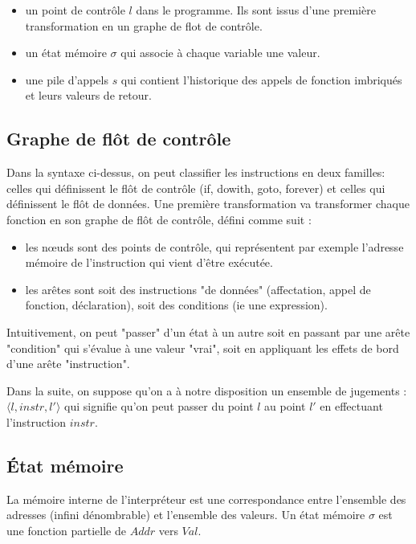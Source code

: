 \documentclass{article}
\begin{document}
\begin{itemize}
\item
  un point de contrôle $l$ dans le programme. Ils sont issus d'une
  première transformation en un graphe de flot de contrôle.
\item
  un état mémoire $σ$ qui associe à chaque variable une valeur.
\item
  une pile d'appels $s$ qui contient l'historique des appels de fonction
  imbriqués et leurs valeurs de retour.
\end{itemize}

\subsection{Graphe de flôt de contrôle}

Dans la syntaxe ci-dessus, on peut classifier les instructions en deux familles:
celles qui définissent le flôt de contrôle (if, dowith, goto, forever) et celles
qui définissent le flôt de données. Une première transformation va transformer
chaque fonction en son graphe de flôt de contrôle, défini comme suit :

\begin{itemize}
\item
  les nœuds sont des points de contrôle, qui représentent par exemple
  l'adresse mémoire de l'instruction qui vient d'être exécutée.
\item
  les arêtes sont soit des instructions "de données" (affectation,
  appel de fonction, déclaration), soit des conditions (ie une
  expression).
\end{itemize}

Intuitivement, on peut "passer" d'un état à un autre soit en passant par une
arête "condition" qui s'évalue à une valeur "vrai", soit en appliquant les
effets de bord d'une arête "instruction".

Dans la suite, on suppose qu'on a à notre disposition un ensemble de jugements :
$\langle l, instr, l' \rangle$ qui signifie qu'on peut passer du point $l$ au
point $l'$ en effectuant l'instruction $instr$.

\subsection{État mémoire}

La mémoire interne de l'interpréteur est une correspondance entre l'ensemble des
adresses (infini dénombrable) et l'ensemble des valeurs. Un état mémoire $σ$ est
une fonction partielle de $Addr$ vers $Val$.
\end{document}
